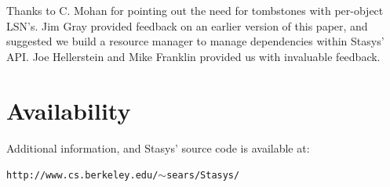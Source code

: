 \documentclass[letterpaper,twocolumn,10pt]{article}
\newcommand{\yad}{Stasys\xspace}
\newcommand{\yads}{Stasys'\xspace}
\begin{document}
Thanks to C. Mohan for pointing out the need for tombstones with
per-object LSN's.  Jim Gray provided feedback on an earlier version of
this paper, and suggested we build a resource manager to manage
dependencies within \yads API.  Joe Hellerstein and Mike Franklin
provided us with invaluable feedback.

\section{Availability}

Additional information, and \yads source code is available at:

\begin{center}
{\small{\tt http://www.cs.berkeley.edu/\ensuremath{\sim}sears/\yad/}}
\end{center}

{\footnotesize 
\nocite{*}
}

\theendnotes
\end{document}
